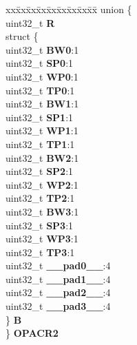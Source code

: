 \begin{DoxyCompactItemize}
\begin{tabbing}
\end{tabbing}\item 
\mbox{\label{structPBRIDGE__B__tag_a04cda4e274553df6d95d908649301118}} 
\begin{tabbing}
xx\=xx\=xx\=xx\=xx\=xx\=xx\=xx\=xx\=\kill
union \{\\
\>uint32\_t {\bfseries R}\\
\>struct \{\\
\>\>uint32\_t {\bfseries BW0}:1\\
\>\>uint32\_t {\bfseries SP0}:1\\
\>\>uint32\_t {\bfseries WP0}:1\\
\>\>uint32\_t {\bfseries TP0}:1\\
\>\>uint32\_t {\bfseries BW1}:1\\
\>\>uint32\_t {\bfseries SP1}:1\\
\>\>uint32\_t {\bfseries WP1}:1\\
\>\>uint32\_t {\bfseries TP1}:1\\
\>\>uint32\_t {\bfseries BW2}:1\\
\>\>uint32\_t {\bfseries SP2}:1\\
\>\>uint32\_t {\bfseries WP2}:1\\
\>\>uint32\_t {\bfseries TP2}:1\\
\>\>uint32\_t {\bfseries BW3}:1\\
\>\>uint32\_t {\bfseries SP3}:1\\
\>\>uint32\_t {\bfseries WP3}:1\\
\>\>uint32\_t {\bfseries TP3}:1\\
\>\>uint32\_t {\bfseries \_\_pad0\_\_}:4\\
\>\>uint32\_t {\bfseries \_\_pad1\_\_}:4\\
\>\>uint32\_t {\bfseries \_\_pad2\_\_}:4\\
\>\>uint32\_t {\bfseries \_\_pad3\_\_}:4\\
\>\} {\bfseries B}\\
\} {\bfseries OPACR2}\\


\end{tabbing}
\end{DoxyCompactItemize}
